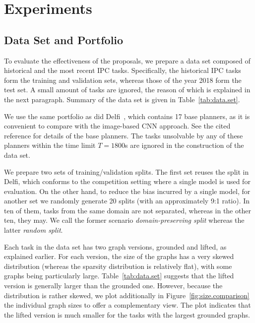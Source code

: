 \documentclass[letterpaper]{article} %
\begin{document}
\section{Experiments}


\subsection{Data Set and Portfolio}
To evaluate the effectiveness of the proposals, we prepare a data set composed of historical and the most recent IPC tasks.
Specifically, the historical IPC tasks form the training and validation sets, whereas those of the year 2018 form the test set. A small amount of tasks are ignored, the reason of which is explained in the next paragraph. Summary of the data set is given in Table~\ref{tab:data.set}.

We use the same portfolio as did Delfi~\cite{katz-et-al-ipc2018}, which contains 17 base planners, as it is convenient to compare with the image-based CNN approach. See the cited reference for details of the base planners. The tasks unsolvable by any of these planners within the time limit $T=1800$s are ignored in the construction of the data set. 

We prepare two sets of training/validation splits. The first set reuses the split in Delfi, which conforms to the competition setting where a single model is used for evaluation. On the other hand, to reduce the bias incurred by a single model, for another set we randomly generate 20 splits (with an approximately 9:1 ratio). In ten of them, tasks from the same domain are not separated, whereas in the other ten, they may. We call the former scenario \emph{domain-preserving split} whereas the latter \emph{random split}.

Each task in the data set has two graph versions, grounded and lifted, as explained earlier. For each version, the size of the graphs has a very skewed distribution (whereas the sparsity distribution is relatively flat), with some graphs being particularly large. Table~\ref{tab:data.set} suggests that the lifted version is generally larger than the grounded one. However, because the distribution is rather skewed, we plot additionally in Figure~\ref{fig:size.comparison} the individual graph sizes to offer a complementary view.
The plot indicates that the lifted version is much smaller for the tasks with the largest grounded graphs.
\end{document}
